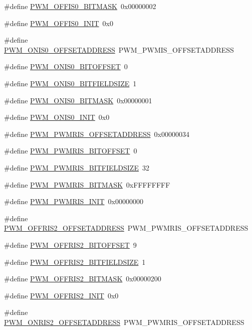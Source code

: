 \begin{DoxyCompactItemize}
\item 
\#define \hyperlink{a00565_a174cd7955e1bb617fb16f705d9e18a2f}{PWM\_\-OFFIS0\_\-BITMASK}~0x00000002
\item 
\#define \hyperlink{a00565_a34d2488e01033e09e389b8e725084bb8}{PWM\_\-OFFIS0\_\-INIT}~0x0
\item 
\#define \hyperlink{a00565_a44a0b021d6963a4246ea3081a5dd50ad}{PWM\_\-ONIS0\_\-OFFSETADDRESS}~PWM\_\-PWMIS\_\-OFFSETADDRESS
\item 
\#define \hyperlink{a00565_a848aae31bbabab473111b05aa885af1e}{PWM\_\-ONIS0\_\-BITOFFSET}~0
\item 
\#define \hyperlink{a00565_af2887ed7f985bc0d495de8817e5902ec}{PWM\_\-ONIS0\_\-BITFIELDSIZE}~1
\item 
\#define \hyperlink{a00565_aaf610b0cb59d94f8b80e62bb8fe11bfc}{PWM\_\-ONIS0\_\-BITMASK}~0x00000001
\item 
\#define \hyperlink{a00565_a8f6965d1e884e33dc231898c6d833cd3}{PWM\_\-ONIS0\_\-INIT}~0x0
\item 
\#define \hyperlink{a00565_ad85bbc1622b6502490eec15b1ab0819b}{PWM\_\-PWMRIS\_\-OFFSETADDRESS}~0x00000034
\item 
\#define \hyperlink{a00565_acaff455b91b6368bbe26d2843c5269da}{PWM\_\-PWMRIS\_\-BITOFFSET}~0
\item 
\#define \hyperlink{a00565_a58f5287ba2f123a06d724a22fb9b85f5}{PWM\_\-PWMRIS\_\-BITFIELDSIZE}~32
\item 
\#define \hyperlink{a00565_a4dec8740cf398f2550ef3685cfbf13e9}{PWM\_\-PWMRIS\_\-BITMASK}~0xFFFFFFFF
\item 
\#define \hyperlink{a00565_a839e8d008fe8c5db26fb49cb48f4595f}{PWM\_\-PWMRIS\_\-INIT}~0x00000000
\item 
\#define \hyperlink{a00565_ab3ad5b76de2aa9acfbc01708c2f516f4}{PWM\_\-OFFRIS2\_\-OFFSETADDRESS}~PWM\_\-PWMRIS\_\-OFFSETADDRESS
\item 
\#define \hyperlink{a00565_a8e66e84d67e008997e47171daaeaa747}{PWM\_\-OFFRIS2\_\-BITOFFSET}~9
\item 
\#define \hyperlink{a00565_aaf2b16c29029a880d26f35958de998e2}{PWM\_\-OFFRIS2\_\-BITFIELDSIZE}~1
\item 
\#define \hyperlink{a00565_a88f29da4b8d1eaa79468e653981c0aa6}{PWM\_\-OFFRIS2\_\-BITMASK}~0x00000200
\item 
\#define \hyperlink{a00565_ae51673cd2a9d20e9f46ac3ac54361084}{PWM\_\-OFFRIS2\_\-INIT}~0x0
\item 
\#define \hyperlink{a00565_a9c251436a956778616254b424b9d9476}{PWM\_\-ONRIS2\_\-OFFSETADDRESS}~PWM\_\-PWMRIS\_\-OFFSETADDRESS

\end{DoxyCompactItemize}

